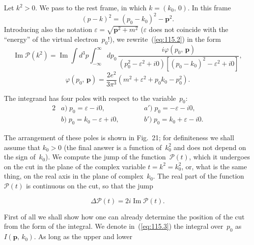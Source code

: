 Let $k^2 > 0$. We pass to the rest frame, in which $k = (k_0,\,0)$. In this frame
\[
(p - k)^2 = (p_0 - k_0)^2 - \mathbf{p}^2.
\]
Introducing also the notation $\varepsilon = \sqrt{\mathbf{p}^2 + m^2}$ ($\varepsilon$ does not coincide with the ``energy'' of the virtual electron~$p_0$!), we rewrite~(\ref{eq:115.2}) in the form
\begin{equation}
\operatorname{Im} \mathcal{P}(k^2) = \operatorname{Im} \int d^3p \int_{-\infty}^{\infty} dp_0\,\frac{i\varphi(p_0,\,\mathbf{p})}{(p_0^2 - \varepsilon^2 + i0)[(p_0 - k_0)^2 - \varepsilon^2 + i0]},
\label{eq:115.3}
\end{equation}
\[
\varphi(p_0,\,\mathbf{p}) = \frac{2e^2}{3\pi^3}(m^2 + \varepsilon^2 + p_0 k_0 - p_0^2).
\]

The integrand has four poles with respect to the variable~$p_0$:
\begin{alignat*}{2}
&\textit{a})\; p_0 = \varepsilon - i0, &\qquad &\textit{a}')\; p_0 = -\varepsilon - i0,\\
&\textit{b})\; p_0 = k_0 - \varepsilon + i0, &\qquad &\textit{b}')\; p_0 = k_0 + \varepsilon - i0.
\end{alignat*}

The arrangement of these poles is shown in Fig.~21; for definiteness we shall assume that $k_0 > 0$ (the final answer is a function of~$k_0^2$ and does not depend on the sign of~$k_0$). We compute the jump of the function~$\mathcal{P}(t)$, which it undergoes on the cut in the plane of the complex variable $t = k^2 = k_0^2$, or, what is the same thing, on the real axis in the plane of complex~$k_0$. The real part of the function~$\mathcal{P}(t)$ is continuous on the cut, so that the jump

\par\noindent

\begin{equation}
\Delta\mathcal{P}(t) = 2i\operatorname{Im}\mathcal{P}(t).
\label{eq:115.4}
\end{equation}

First of all we shall show how one can already determine the position of the cut from the form of the integral. We denote in~(\ref{eq:115.3}) the integral over~$p_0$ as $I(\mathbf{p},\,k_0)$. As long as the upper and lower


